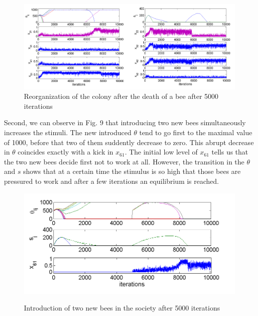 \begin{figure}
\centerline{\includegraphics[scale=0.42]{figures/Figure4}}
\label{fig:figure6}
\caption{Reorganization of the colony after the death of a bee after 5000 iterations}
\end{figure}


Second, we can observe in Fig. 9 that introducing two new bees
simultaneously increases the stimuli. The new introduced $\theta$ tend to go first to the maximal value of 1000, before that two of them suddently decrease to zero. This abrupt decrease in $\theta$ coincides exactly with a kick in $x_{61}$. The initial low level of $x_{61}$ tells us that the two new bees decide first not to work at all. However, the transition in the $\theta$ and $s$ shows that at a certain time the stimulus is so high that those bees are pressured to work and after a few iterations an equilibrium is reached. 


\begin{figure}[ht!]
\begin{centering}
\includegraphics[scale=0.8]{figures/Figure5}
\label{fig:figure7}
\par\end{centering}

\centering{}\caption{Introduction of two new bees in the society after 5000 iterations}
\end{figure}


